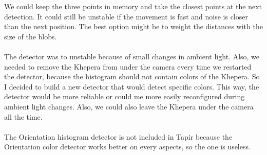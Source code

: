     We could keep the three points in memory and take the closest points 
    at the next detection. It could still be unstable if the movement is 
    fast and noise is closer than the next position. The best option might 
    be to weight the distances with the size of the blobs. 
    \\
    \\
    The detector was to unstable because of small changes in ambient light.
    Also, we needed to remove the Khepera from under the camera every time 
    we restarted the detector, because the histogram should not contain 
    colors of the Khepera. So I decided to build a new detector that would 
    detect specific colors. This way, the detector would be more reliable 
    or could me more easily reconfigured during ambient light changes. 
    Also, we could also leave the Khepera under the camera all the time. 
    \\
    \\
    The Orientation histogram detector is not included in Tapir because 
    the Orientation color detector works better on every aspects, so the 
    one is useless.

